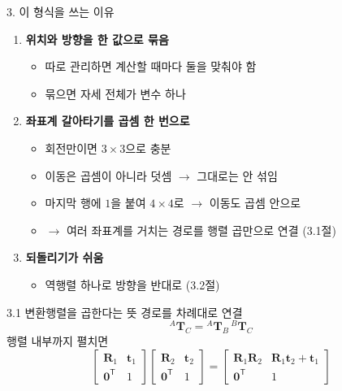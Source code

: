 \documentclass[aspectratio=169,11pt]{beamer}
\begin{document}
\begin{frame}{3. 이 형식을 쓰는 이유}
  \begin{enumerate}
    \item \textbf{위치와 방향을 한 값으로 묶음}
      \begin{itemize}
        \item 따로 관리하면 계산할 때마다 둘을 맞춰야 함
        \item 묶으면 자세 전체가 변수 하나
      \end{itemize}
      \vspace{2mm}
    \item \textbf{좌표계 갈아타기를 곱셈 한 번으로}
      \begin{itemize}
        \item 회전만이면 $3 \times 3$으로 충분
        \item 이동은 곱셈이 아니라 덧셈 $\rightarrow$ 그대로는 안 섞임
        \item 마지막 행에 $1$을 붙여 $4 \times 4$로 $\rightarrow$ 이동도 곱셈 안으로
        \item $\rightarrow$ 여러 좌표계를 거치는 경로를 행렬 곱만으로 연결 (3.1절)
      \end{itemize}
      \vspace{2mm}
    \item \textbf{되돌리기가 쉬움}
      \begin{itemize}
        \item 역행렬 하나로 방향을 반대로 (3.2절)
      \end{itemize}
  \end{enumerate}
\end{frame}

\begin{frame}{3.1 변환행렬을 곱한다는 뜻}
  경로를 차례대로 연결
  \[
    {}^{A}\mathbf{T}_{C}
    =
    {}^{A}\mathbf{T}_{B}\,
    {}^{B}\mathbf{T}_{C}
  \]
  \vfill
  행렬 내부까지 펼치면
  \[
    \begin{bmatrix}
      \mathbf{R}_1 & \mathbf{t}_1 \\
      \mathbf{0}^{\mathsf T} & 1
    \end{bmatrix}
    \begin{bmatrix}
      \mathbf{R}_2 & \mathbf{t}_2 \\
      \mathbf{0}^{\mathsf T} & 1
    \end{bmatrix}
    =
    \begin{bmatrix}
      \mathbf{R}_1\mathbf{R}_2 & \mathbf{R}_1\mathbf{t}_2+\mathbf{t}_1 \\
      \mathbf{0}^{\mathsf T} & 1
    \end{bmatrix}
  \]
\end{frame}
\end{document}
